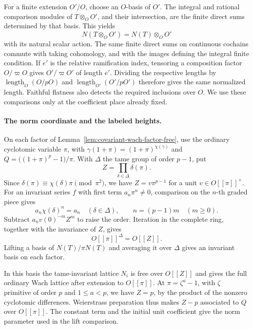 For a finite extension \(O'/O\), choose an \(O\)-basis of
\(O'\). The integral and rational comparison modules of
\(T\otimes_O O'\), and their intersection, are the finite
direct sums determined by that basis. This yields
\[
       N(T\otimes_O O')=N(T)\otimes_O O'
\]
with its natural scalar action. The same finite direct sums on
continuous cochains commute with taking cohomology, and with the
images defining the integral finite condition. If \(e'\) is
the relative ramification index, tensoring a composition factor
\(O/\varpi O\) gives \(O'/\varpi O'\) of length \(e'\).
Dividing the respective lengths by \(\operatorname{length}_O(O/pO)\)
and \(\operatorname{length}_{O'}(O'/pO')\) therefore gives the
same normalized length. Faithful flatness
also detects the required inclusions over \(O\). We use
these comparisons only at the coefficient place already fixed.

\paragraph{The norm coordinate and the labeled heights.}
On each factor of Lemma~\ref{lem:covariant-wach-factor-free},
use the ordinary cyclotomic variable \(\pi\), with
\(\gamma(1+\pi)=(1+\pi)^{\chi(\gamma)}\) and
\(Q=\big((1+\pi)^p-1\big)/\pi\). With \(\Delta\) the tame
group of order \(p-1\), put
\[
     Z=\prod_{\delta\in\Delta}\delta(\pi).
\]
Since \(\delta(\pi)\equiv\chi(\delta)\pi\pmod{\pi^2}\),
we have \(Z=v\pi^{p-1}\) for a unit \(v\in O[[\pi]]^\times\).
For an invariant series \(f\) with first term \(a_n\pi^n\ne0\),
comparison on the \(n\)-th graded piece gives
\[
 a_n\chi(\delta)^n=a_n\quad(\delta\in\Delta),
 \qquad n=(p-1)m\quad(m\ge0).
\]
Subtract \(a_n v(0)^{-m}Z^m\) to raise the order. Iteration
in the complete ring, together with the invariance of \(Z\),
gives
\[
 O[[\pi]]^\Delta=O[[Z]].
\]
Lifting a basis of \(N(T)/\pi N(T)\) and averaging
it over \(\Delta\) gives an invariant basis on each factor.

In
this basis the tame-invariant lattice \(N_i\) is free over
\(O[[Z]]\) and gives the full ordinary Wach lattice after
extension to \(O[[\pi]]\). At \(\pi=\zeta^a-1\), with
\(\zeta\) primitive of order \(p\) and \(1\le a<p\), we have
\(Z=p\), by the product of the nonzero cyclotomic differences.
Weierstrass preparation thus makes \(Z-p\) associated to \(Q\)
over \(O[[\pi]]\). The constant term and the initial unit
coefficient give the norm parameter used in the lift comparison.

